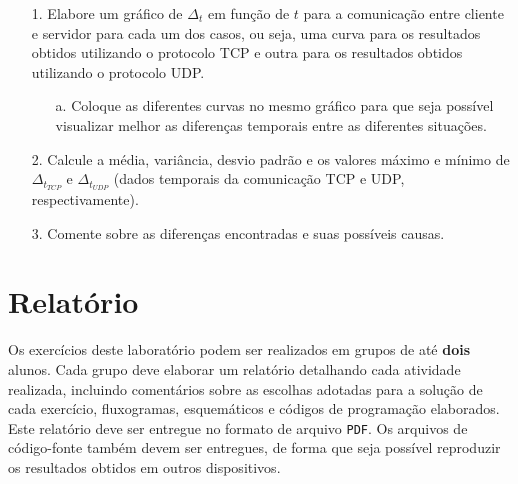 \documentclass[12pt]{article}
\newcommand{\ebt}[2]{\textcolor{#1}{\texttt{#2}}}
\newcommand{\ebf}[2]{\textcolor{#1}{\textbf{#2}}}
\begin{document}
\begin{itemize}
    \begin{itemize}
      \item[1.] Elabore um gráfico de $ \Delta_t $ em função de $ t $ para a
        comunicação entre cliente e servidor para cada um dos casos, ou seja, uma
        curva para os resultados obtidos utilizando o protocolo TCP e outra para
        os resultados obtidos utilizando o protocolo UDP.
      \begin{itemize}
        \item[a.] Coloque as diferentes curvas no mesmo gráfico para que seja possível
          visualizar melhor as diferenças temporais entre as diferentes situações.
      \end{itemize}
      \item[2.] Calcule a média, variância, desvio padrão e os valores máximo e mínimo
        de $ \Delta_{t_{TCP}} $ e $ \Delta_{t_{UDP}} $ (dados temporais da comunicação
        TCP e UDP, respectivamente).
      \item[3.] Comente sobre as diferenças encontradas e suas possíveis causas.
    \end{itemize}
\end{itemize}

\section*{Relatório}

Os exercícios deste laboratório podem ser realizados em grupos de até \ebf{rdy}{dois}
alunos. Cada grupo deve elaborar um relatório detalhando cada atividade realizada,
incluindo comentários sobre as escolhas adotadas para a solução de cada exercício,
fluxogramas, esquemáticos e códigos de programação elaborados. Este relatório deve
ser entregue no formato de arquivo \ebt{rdy}{PDF}. Os arquivos de código-fonte também
devem ser entregues, de forma que seja possível reproduzir os resultados obtidos em
outros dispositivos.
\end{document}
